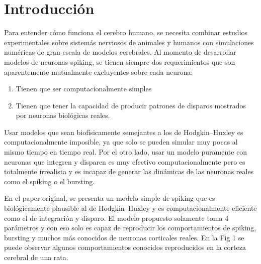 \documentclass[12pt]{article}
\begin{document}
\section{Introducción}
Para entender cómo funciona el cerebro humano, se necesita combinar estudios experimentales sobre sistemás nerviosos de animales y humanos con simulaciones numéricas de gran escala de modelos cerebrales.
Al momento de desarrollar modelos de neuronas spiking, se tienen siempre dos requerimientos que son aparentemente mutualmente excluyentes sobre cada neurona:
\begin{enumerate}
    \item Tienen que ser computacionalmente simples
    \item Tienen que tener la capacidad de producir patrones de disparos mostrados por neuronas biológicas reales.
\end{enumerate}

Usar modelos que sean biofísicamente semejantes a los de Hodgkin–Huxley es computacionalmente imposible, ya que solo se pueden simular muy pocas al mismo tiempo en tiempo real. Por el otro lado, usar un modelo
puramente con neuronas que integren y disparen es muy efectivo computacionalmente pero es totalmente irrealista y es incapaz de generar las dinámicas de las neuronas reales como el spiking o el bursting.

En el paper original, se presenta un modelo simple de spiking que es biológicamente plausible al de Hodgkin–Huxley y es computacionalmente eficiente como el de integración y disparo.
El modelo propuesto solamente toma 4 parámetros y con eso solo es capaz de reproducir los comportamientos de spiking, bursting y muchos más conocidos de neuronas corticales reales. En la Fig 1 se puede observar
algunos comportamientos conocidos reproducidos en la corteza cerebral de una rata. \\ \\

\newpage
\end{document}
